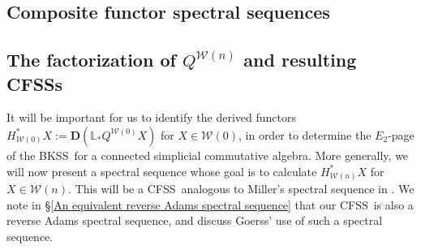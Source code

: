 \documentclass[11pt]{amsart} \renewcommand{\baselinestretch}{1.2}
\theoremstyle{plain}
\numberwithin{equation}{section} %
\theoremstyle{plain}
\numberwithin{equation}{chapter} %
\newcommand{\calw}{\mathcal{W}}
\newcommand{\citeBOX}[2][]{\cite[\mbox{#1}]{#2}}
\newcommand{\dual}{\mathbf{D}}
\newcommand{\BKSS}{BKSS}
\newcommand{\CFSS}{CFSS}
\newcommand{\CFSSs}{CFSSs}
\newcommand{\SectionOrChapter}[1]{\section{\textbf{#1}}}
\newcommand{\SubsectionOrSection}[1]{\subsection{#1}}
\begin{document}
\begin{Comp funct sseqs}

\SectionOrChapter{Composite functor spectral sequences}
\label{Comp funct sseqs}


\SubsectionOrSection{The factorization of $Q^{\calw(n)}$ and resulting \CFSSs}
\label{Comp funct sseqs first section}

It will be important for us to identify the derived functors $H^*_{\calw(0)}X:=\dual(\mathbb{L}_*Q^{\calw(0)}X)$ for $X\in\calw(0)$, in order to determine the  $E_2$-page of the \BKSS\ for a connected simplicial commutative algebra. More generally, we will now present a spectral sequence whose goal is to calculate $H^*_{\calw(n)}X$ for $X\in\calw(n)$. This will be a \CFSS\ analogous to Miller's spectral sequence in \citeBOX[\S2]{MillerSullivanConjecture.pdf}. We note in \S\ref{An equivalent reverse Adams spectral sequence} that our \CFSS\ is also a reverse Adams spectral sequence, and discuss Goerss' use of such a spectral sequence.



\end{Comp funct sseqs}
\end{document}
